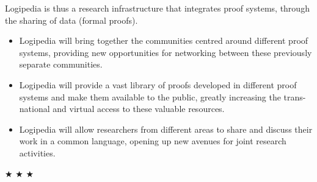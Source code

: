 

Logipedia is thus a research infrastructure that integrates proof
systems, through the sharing of data (formal proofs).

\begin{itemize}
\item Logipedia will bring together the communities centred around
  different proof systems, providing new opportunities for networking
  between these previously separate communities.

\item Logipedia will provide a vast library of proofs developed in
  different proof systems and make them available to the public,
  greatly increasing the trans-national and virtual access to these
  valuable resources.

\item Logipedia will allow researchers from different areas to share
  and discuss their work in a common language, opening up new avenues
  for joint research activities.
\end{itemize}


\begin{center}
$\bigstar$ $\bigstar$ $\bigstar$
\end{center}

